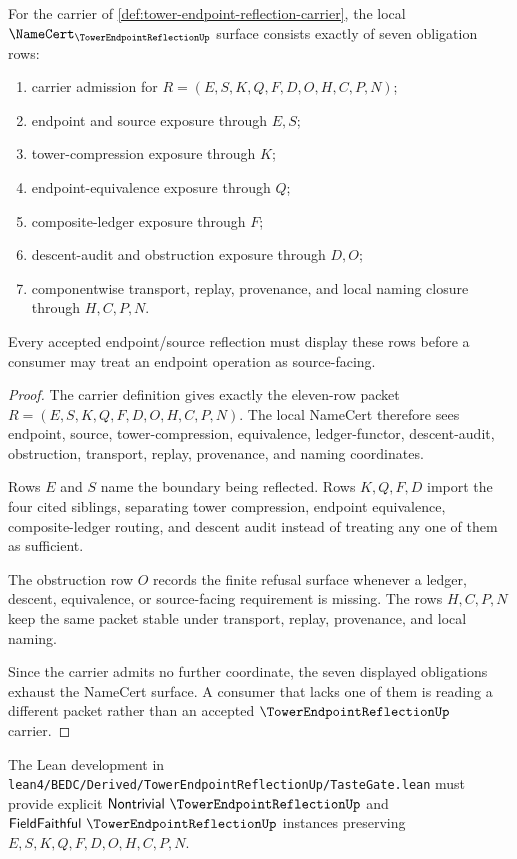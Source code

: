 \begin{theorem}
\label{thm:tower-endpoint-reflection-namecert-obligations}
For the carrier of \autoref{def:tower-endpoint-reflection-carrier}, the local $\NameCert_{\TowerEndpointReflectionUp}$ surface consists exactly of seven obligation rows:
\begin{enumerate}
\item carrier admission for $R=(E,S,K,Q,F,D,O,H,C,P,N)$;
\item endpoint and source exposure through $E,S$;
\item tower-compression exposure through $K$;
\item endpoint-equivalence exposure through $Q$;
\item composite-ledger exposure through $F$;
\item descent-audit and obstruction exposure through $D,O$;
\item componentwise transport, replay, provenance, and local naming closure through $H,C,P,N$.
\end{enumerate}
Every accepted endpoint/source reflection must display these rows before a consumer may treat an endpoint operation as source-facing.
\end{theorem}
\begin{proof}
The carrier definition gives exactly the eleven-row packet $R=(E,S,K,Q,F,D,O,H,C,P,N)$. The local NameCert therefore sees endpoint, source, tower-compression, equivalence, ledger-functor, descent-audit, obstruction, transport, replay, provenance, and naming coordinates.

Rows $E$ and $S$ name the boundary being reflected. Rows $K,Q,F,D$ import the four cited siblings, separating tower compression, endpoint equivalence, composite-ledger routing, and descent audit instead of treating any one of them as sufficient.

The obstruction row $O$ records the finite refusal surface whenever a ledger, descent, equivalence, or source-facing requirement is missing. The rows $H,C,P,N$ keep the same packet stable under transport, replay, provenance, and local naming.

Since the carrier admits no further coordinate, the seven displayed obligations exhaust the NameCert surface. A consumer that lacks one of them is reading a different packet rather than an accepted $\TowerEndpointReflectionUp$ carrier.
\end{proof}

The Lean development in \texttt{lean4/BEDC/Derived/TowerEndpointReflectionUp/TasteGate.lean} must provide explicit $\mathsf{Nontrivial}\ \TowerEndpointReflectionUp$ and $\mathsf{FieldFaithful}\ \TowerEndpointReflectionUp$ instances preserving $E,S,K,Q,F,D,O,H,C,P,N$.

